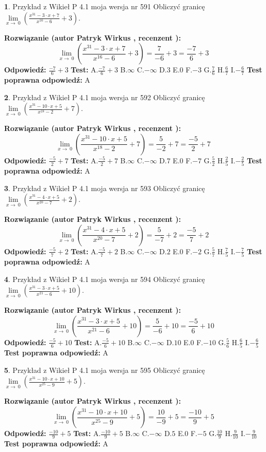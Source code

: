 \documentclass[12pt, a4paper]{article}
\theoremstyle{definition} %
\newtheorem{zad}{}
\newcommand{\zadStart}[1]{\begin{zad}#1\newline}
\newcommand{\zadStop}{\end{zad}}
\newcommand{\rozwStart}[2]{\noindent \textbf{Rozwiązanie (autor #1 , recenzent #2): }\newline}
\newcommand{\rozwStop}{\newline}
\newcommand{\odpStart}{\noindent \textbf{Odpowiedź:}\newline}
\newcommand{\odpStop}{\newline}
\newcommand{\testStart}{\noindent \textbf{Test:}\newline}
\newcommand{\testStop}{\newline}
\newcommand{\kluczStart}{\noindent \textbf{Test poprawna odpowiedź:}\newline}
\newcommand{\kluczStop}{\newline}
\begin{document}
\zadStart{Przykład z Wikieł P 4.1 moja wersja nr 591}
Obliczyć granicę $\lim\limits_{x\to\ 0}(\frac{x^{31}-3 \cdot x +7}{x^{16}-6}+3)$.
\zadStop
\rozwStart{Patryk Wirkus}{}
$$\lim\limits_{x\to\ 0}(\frac{x^{31}-3 \cdot x +7}{x^{16}-6}+3)=\frac{7}{-6}+3=\frac{-7}{6}+3$$
\rozwStop
\odpStart
$\frac{-7}{6}+3$
\odpStop
\testStart
A.$\frac{-7}{6}+3$
B.$\infty$
C.$-\infty$
D.$3$
E.$0$
F.$-3$
G.$\frac{7}{6}$
H.$\frac{6}{7}$
I.$-\frac{6}{7}$
\testStop
\kluczStart
A
\kluczStop



\zadStart{Przykład z Wikieł P 4.1 moja wersja nr 592}
Obliczyć granicę $\lim\limits_{x\to\ 0}(\frac{x^{31}-10 \cdot x +5}{x^{18}-2}+7)$.
\zadStop
\rozwStart{Patryk Wirkus}{}
$$\lim\limits_{x\to\ 0}(\frac{x^{31}-10 \cdot x +5}{x^{18}-2}+7)=\frac{5}{-2}+7=\frac{-5}{2}+7$$
\rozwStop
\odpStart
$\frac{-5}{2}+7$
\odpStop
\testStart
A.$\frac{-5}{2}+7$
B.$\infty$
C.$-\infty$
D.$7$
E.$0$
F.$-7$
G.$\frac{5}{2}$
H.$\frac{2}{5}$
I.$-\frac{2}{5}$
\testStop
\kluczStart
A
\kluczStop



\zadStart{Przykład z Wikieł P 4.1 moja wersja nr 593}
Obliczyć granicę $\lim\limits_{x\to\ 0}(\frac{x^{31}-4 \cdot x +5}{x^{20}-7}+2)$.
\zadStop
\rozwStart{Patryk Wirkus}{}
$$\lim\limits_{x\to\ 0}(\frac{x^{31}-4 \cdot x +5}{x^{20}-7}+2)=\frac{5}{-7}+2=\frac{-5}{7}+2$$
\rozwStop
\odpStart
$\frac{-5}{7}+2$
\odpStop
\testStart
A.$\frac{-5}{7}+2$
B.$\infty$
C.$-\infty$
D.$2$
E.$0$
F.$-2$
G.$\frac{5}{7}$
H.$\frac{7}{5}$
I.$-\frac{7}{5}$
\testStop
\kluczStart
A
\kluczStop



\zadStart{Przykład z Wikieł P 4.1 moja wersja nr 594}
Obliczyć granicę $\lim\limits_{x\to\ 0}(\frac{x^{31}-3 \cdot x +5}{x^{21}-6}+10)$.
\zadStop
\rozwStart{Patryk Wirkus}{}
$$\lim\limits_{x\to\ 0}(\frac{x^{31}-3 \cdot x +5}{x^{21}-6}+10)=\frac{5}{-6}+10=\frac{-5}{6}+10$$
\rozwStop
\odpStart
$\frac{-5}{6}+10$
\odpStop
\testStart
A.$\frac{-5}{6}+10$
B.$\infty$
C.$-\infty$
D.$10$
E.$0$
F.$-10$
G.$\frac{5}{6}$
H.$\frac{6}{5}$
I.$-\frac{6}{5}$
\testStop
\kluczStart
A
\kluczStop



\zadStart{Przykład z Wikieł P 4.1 moja wersja nr 595}
Obliczyć granicę $\lim\limits_{x\to\ 0}(\frac{x^{31}-10 \cdot x +10}{x^{25}-9}+5)$.
\zadStop
\rozwStart{Patryk Wirkus}{}
$$\lim\limits_{x\to\ 0}(\frac{x^{31}-10 \cdot x +10}{x^{25}-9}+5)=\frac{10}{-9}+5=\frac{-10}{9}+5$$
\rozwStop
\odpStart
$\frac{-10}{9}+5$
\odpStop
\testStart
A.$\frac{-10}{9}+5$
B.$\infty$
C.$-\infty$
D.$5$
E.$0$
F.$-5$
G.$\frac{10}{9}$
H.$\frac{9}{10}$
I.$-\frac{9}{10}$
\testStop
\kluczStart
A
\kluczStop
\end{document}
